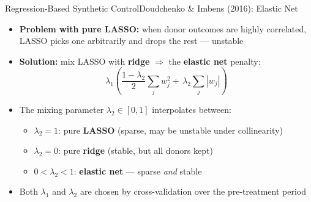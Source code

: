 \documentclass[hyperref={pdfpagelabels=false}]{beamer}
\begin{document}
\begin{frame}{Regression-Based Synthetic Control}{Doudchenko \& Imbens (2016): Elastic Net}
\begin{itemize}
	\item \textbf{Problem with pure LASSO:} when donor outcomes are highly correlated, LASSO picks one arbitrarily and drops the rest --- unstable
	\vspace{0.3cm}
	\item \textbf{Solution:} mix LASSO with \textbf{ridge} $\Rightarrow$ the \textbf{elastic net} penalty:
	\begin{equation*}
		\lambda_1\!\left(\frac{1-\lambda_2}{2}\sum_j w_j^2
		+\,\lambda_2\sum_j|w_j|\right)
	\end{equation*}
	\vspace{0.2cm}
	\item The mixing parameter $\lambda_2 \in [0,1]$ interpolates between:
	\vspace{0.1cm}
	\begin{itemize}
		\item $\lambda_2 = 1$: pure \textbf{LASSO} (sparse, may be unstable under collinearity)
		\vspace{0.1cm}
		\item $\lambda_2 = 0$: pure \textbf{ridge} (stable, but all donors kept)
		\vspace{0.1cm}
		\item $0 < \lambda_2 < 1$: \textbf{elastic net} --- sparse \emph{and} stable
	\end{itemize}
	\vspace{0.2cm}
	\item Both $\lambda_1$ and $\lambda_2$ are chosen by cross-validation over the pre-treatment period
\end{itemize}
\end{frame}


\end{document}
